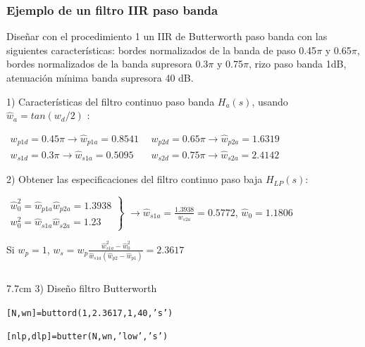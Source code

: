 \documentclass[handout]{beamer}
\numberwithin{section}{part}
\begin{document}
\begin{frame}
\frametitle{Ejemplo de un filtro  IIR paso banda}
\footnotesize

\footnotesize
\color{olivegreen} Diseñar con el procedimiento 1 un IIR de Butterworth paso banda con las siguientes características: bordes normalizados de la banda de paso 0.45$\pi$ y 0.65$\pi$, bordes normalizados de la banda supresora 0.3$\pi$ y 0.75$\pi$, rizo paso banda 1dB, atenuación mínima banda supresora 40 dB.
\color{gray}
\vspace{0.1cm}

1)  Características del filtro continuo paso banda $H_a(s)$, usando $\hat w_{a}=tan(w_{d}/2)$  :

$\begin{array}{ll}w_{p1d}=0.45\pi \rightarrow \hat w_{p1a}=0.8541 &\:\: w_{p2d}=0.65\pi \rightarrow \hat w_{p2a}=1.6319 \\
w_{s1d}=0.3\pi \rightarrow \hat w_{s1a}=0.5095 &\:\: w_{s2d}=0.75\pi \rightarrow \hat w_{s2a}=2.4142
\end{array}$

\vspace{0.1cm}

2) Obtener las especificaciones del filtro continuo paso baja $H_{LP}(s)$:

\vspace{0.1cm}

$\left . \begin{array}{l}\hat w_0^2 =\hat w_{p1a}\hat w_{p2a}=1.3938\\w_0^2 =\hat w_{s1a}\hat w_{s2a}=1.23
\end{array} \right \}$ $\rightarrow \hat w_{s1a}=\frac{1.3938}{w_{s2a}}=0.5772$, $\hat w_0=1.1806$


\hspace{0.25cm}Si $w_p=1$, $w_{s}=w_p\frac{\hat w_{s1a}^2-\hat w_0^2}{\hat w_{s1a} (\hat w_{p2}-\hat w_{p1})}=2.3617$


\vspace{0.1cm}

\begin{columns}[T]
 \hspace{0.2cm}\begin{column}{7.7cm}
3) Diseño filtro Butterworth

\vspace{0.1cm}

\hspace{0.25cm}\texttt{[N,wn]=buttord(1,2.3617,1,40,'s')}

\hspace{0.25cm}\texttt{[nlp,dlp]=butter(N,wn,'low','s')}


\end{column}
\end{columns}
\end{frame}
\end{document}
